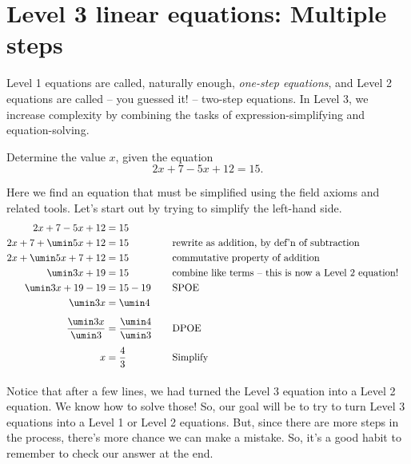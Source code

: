 \section{Level 3 linear equations: Multiple steps}
\label{sec:linearlevel3}

Level 1 equations are called, naturally enough, \textit{one-step equations}, and Level 2 equations are called -- you guessed it! -- two-step equations. In Level 3, we increase complexity by combining the tasks of expression-simplifying and equation-solving.


\begin{boxexplore}
Determine the value $x$, given the equation \[2x + 7 - 5x + 12 = 15.\]
\end{boxexplore} %

Here we find an equation that must be simplified using the field axioms and related tools. Let's start out by trying to simplify the left-hand side.
\[\begin{aligned}
2x + 7 - 5x + 12 & = 15\\
2x + 7 + \umin5x + 12 & = 15
&&\text{\quad rewrite as addition, by def'n of subtraction}\\
2x + \umin5x + 7 + 12 & = 15
&&\text{\quad commutative property of addition}\\
\umin3x + 19 & = 15
&&\text{\quad combine like terms -- this is now a Level 2 equation!}\\
\umin3x + 19 - 19 & = 15 - 19
&&\text{\quad SPOE}\\
\umin3x & = \umin4
&&\text{}\\[1ex]
\frac{\umin3x}{\umin3} & = \frac{\umin4}{\umin3}
&&\text{\quad DPOE}\\[1ex]
x & = \frac{4}{3}
&&\text{\quad Simplify}\\[1ex]
\end{aligned}\]

Notice that after a few lines, we had turned the Level 3 equation into a Level 2 equation. We know how to solve those! So, our goal will be to try to turn Level 3 equations into a Level 1 or Level 2 equations. But, since there are more steps in the process, there's more chance we can make a mistake. So, it's a good habit to remember to check our answer at the end.

